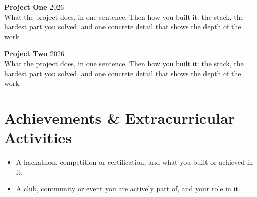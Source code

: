 \documentclass[10.5pt,letterpaper]{article}
\begin{document}
\textbf{Project One}
\hfill 2026 \\
What the project does, in one sentence. Then how you built it: the
stack, the hardest part you solved, and one concrete detail that shows
the depth of the work.

\vspace{6pt}

\textbf{Project Two}
\hfill 2026 \\
What the project does, in one sentence. Then how you built it: the
stack, the hardest part you solved, and one concrete detail that shows
the depth of the work.


\section{Achievements \& Extracurricular Activities}

\begin{itemize}

\item
A hackathon, competition or certification, and what you built or
achieved in it.

\item
A club, community or event you are actively part of, and your role
in it.

\end{itemize}
\end{document}
